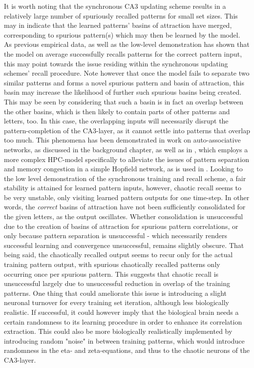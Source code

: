 It is worth noting that the synchronous CA3 updating scheme results in a relatively large number of spuriously recalled patterns for small set sizes. This may in indicate that the learned patterns' basins of attraction have merged, corresponding to spurious pattern(s) which may then be learned by the model. As previous empirical data, as well as the low-level demonstration has shown that the model on average successfully recalls patterns for the correct pattern input, this may point towards the issue residing within the synchronous updating schemes' recall procedure. 
Note however that once the model fails to separate two similar patterns and forms a novel spurious pattern and basin of attraction, this basin may increase the likelihood of further such spurious basins being created. This may be seen by considering that such a basin is in fact an overlap between the other basins, which is then likely to contain parts of other patterns and letters, too. In this case, the overlapping inputs will necessarily disrupt the pattern-completion of the CA3-layer, as it cannot settle into patterns that overlap too much. This phenomena has been demonstrated in work on auto-associative networks, as discussed in the background chapter, as well as in \citep{Hattori2014}, which employs a more complex HPC-model specifically to alleviate the issues of pattern separation and memory congestion in a simple Hopfield network, as is used in \citep{Hattori2010}.
Looking to the low level demonstration of the synchronous training and recall scheme, a fair stability is attained for learned pattern inputs, however, chaotic recall seems to be very unstable, only visiting learned pattern outputs for one time-step. In other words, the \textit{correct} basins of attraction have not been sufficiently consolidated for the given letters, as the output oscillates. Whether consolidation is unsuccessful due to the creation of basins of attraction for spurious pattern correlations, or only because pattern separation is unsuccessful - which necessarily renders successful learning and convergence unsuccessful, remains slightly obscure. That being said, the chaotically recalled output seems to recur only for the actual training pattern output, with spurious chaotically recalled patterns only occurring once per spurious pattern. This suggests that chaotic recall is unsuccessful largely due to unsuccessful reduction in overlap of the training patterns. One thing that could ameliorate this issue is introducing a slight neuronal turnover for every training set iteration, although less biologically realistic. If successful, it could however imply that the biological brain needs a certain randomness to its learning procedure in order to enhance its correlation extraction. This could also be more biologically realistically implemented by introducing random "noise" in between training patterns, which would introduce randomness in the eta- and zeta-equations, and thus to the chaotic neurons of the CA3-layer.
